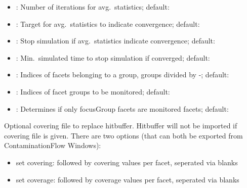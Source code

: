\begin{itemize}[noitemsep,topsep=0pt, partopsep=0pt]
\item {}: Number of iterations for avg.\ statistics; default: 
\item {}: Target for avg.\ statistics to indicate convergence; default: 
\item {}: Stop simulation if avg.\ statistics indicate convergence; default: 
\item {}: Min.\ simulated time to stop simulation if converged; default: 
\item {}:  Indices of facets belonging to a group, groups divided by -; default:\codew{[]}
\item {}: Indices of facet groups to be monitored; default:\codew{[]}
\item {}: Determines if only focusGroup facets are monitored facets; default:
\end{itemize}
\bigskip
Optional covering file to replace hitbuffer. Hitbuffer will not be imported if covering file is given. There are two options (that can both be exported from ContaminationFlow Windows):
\begin{itemize}[noitemsep,topsep=0pt, partopsep=0pt]
\item  set covering:  followed by covering values per facet, seperated via blanks
\item  set coverage:  followed by coverage values per facet, seperated via blanks
\end{itemize}
%
%

